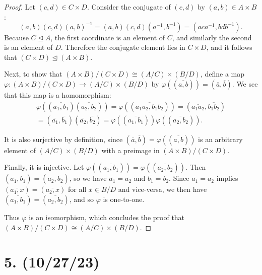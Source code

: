 \documentclass{article}
\begin{document}
\begin{proof}
    Let $(c, d) \in C \times D$. Consider the conjugate of $(c, d)$ by $(a, b) \in A \times B$:
    \begin{equation*}
        (a, b)(c, d)(a, b)^{-1} = (a, b)(c, d)(a^{-1}, b^{-1}) = (aca^{-1}, bdb^{-1}).
    \end{equation*}
    Because $C \unlhd A$, the first coordinate is an element of $C$, and similarly the second is an element of $D$. Therefore the conjugate element lies in $C \times D$, and it follows that $(C \times D) \unlhd (A \times B)$.

    Next, to show that $(A \times B)/(C \times D) \cong (A / C) \times (B / D)$, define a map $\varphi: (A \times B)/(C \times D) \rightarrow (A / C) \times (B / D)$ by $\varphi((\overline{a, b})) = (\overline{a}, \overline{b})$. We see that this map is a homomorphism:
    \begin{multline*}
        \varphi((\overline{a_1, b_1})(\overline{a_2, b_2})) = \varphi((\overline{a_1 a_2, b_1 b_2})) = (\overline{a_1 a_2}, \overline{b_1 b_2}) \\ = (\overline{a_1}, \overline{b_1})(\overline{a_2}, \overline{b_2}) = \varphi((\overline{a_1, b_1}))\varphi((\overline{a_2, b_2})).
    \end{multline*}

    It is also surjective by definition, since $(\overline{a}, \overline{b}) = \varphi((\overline{a, b}))$ is an arbitrary element of $(A / C) \times (B / D)$ with a preimage in $(A \times B)/(C \times D)$.

    Finally, it is injective. Let $\varphi((\overline{a_1, b_1})) = \varphi((\overline{a_2, b_2}))$. Then $(\overline{a_1}, \overline{b_1}) = (\overline{a_2}, \overline{b_2})$, so we have $\overline{a_1} = \overline{a_2}$ and $\overline{b_1} = \overline{b_2}$. Since $\overline{a_1} = \overline{a_2}$ implies $(\overline{a_1, x}) = (\overline{a_2, x})$ for all $\overline{x} \in B/D$ and vice-versa, we then have $(\overline{a_1, b_1}) = (\overline{a_2, b_2})$, and so $\varphi$ is one-to-one.

    Thus $\varphi$ is an isomorphism, which concludes the proof that $(A \times B)/(C \times D) \cong (A / C) \times (B / D)$.
\end{proof}

\section*{5. (10/27/23)}
\end{document}
